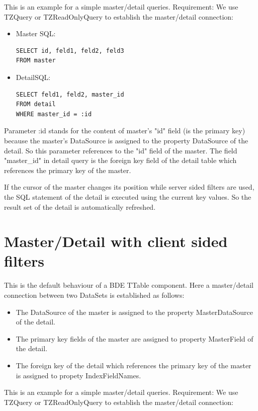 \documentclass[a4paper,12pt,oneside]{book}
\begin{document}
This is an example for a simple master/detail queries. Requirement: We use TZQuery or TZReadOnlyQuery to establish the master/detail connection:

\begin{itemize}
\item Master SQL:
\begin{verbatim}
SELECT id, feld1, feld2, feld3
FROM master
\end{verbatim}

\item DetailSQL:
\begin{verbatim}
SELECT feld1, feld2, master_id
FROM detail
WHERE master_id = :id
\end{verbatim}
\end{itemize}

Parameter :id stands for the content of master's "id" field (is the primary key) because the master's DataSource is assigned to the property DataSource of the detail.
So this parameter references to the "id" field of the master.
The field "master\_id" in detail query is the foreign key field of the detail table which references the primary key of the master.

If the cursor of the master changes its position while server sided filters are used, the SQL statement of the detail is executed using the current key values.
So the result set of the detail is automatically refreshed.

\section{Master/Detail with client sided filters}
This is the default behaviour of a BDE TTable component.
Here a master/detail connection between two DataSets is established as follows:

\begin{itemize}
  \item The DataSource of the master is assigned to the property MasterDataSource of the detail.
	\item The primary key fields of the master are assigned to property MasterField of the detail.
	\item The foreign key of the detail which references the primary key of the master is assigned to propety IndexFieldNames.
\end{itemize}

This is an example for a simple master/detail queries.
Requirement: We use TZQuery or TZReadOnlyQuery to establish the master/detail connection:
\end{document}
